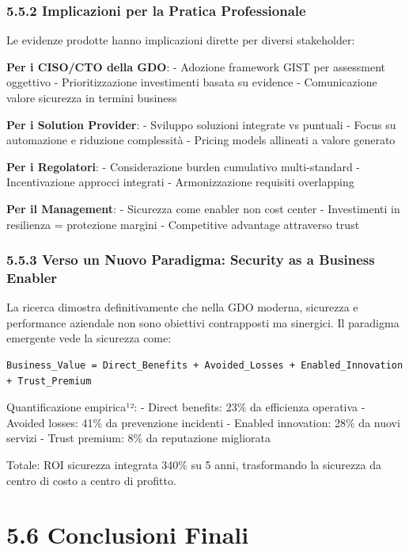 \documentclass{report}
\begin{document}
\subsubsection{5.5.2 Implicazioni per la Pratica
Professionale}\label{implicazioni-per-la-pratica-professionale}

Le evidenze prodotte hanno implicazioni dirette per diversi stakeholder:

\textbf{Per i CISO/CTO della GDO}: - Adozione framework GIST per
assessment oggettivo - Prioritizzazione investimenti basata su evidence
- Comunicazione valore sicurezza in termini business

\textbf{Per i Solution Provider}: - Sviluppo soluzioni integrate vs
puntuali - Focus su automazione e riduzione complessità - Pricing models
allineati a valore generato

\textbf{Per i Regolatori}: - Considerazione burden cumulativo
multi-standard - Incentivazione approcci integrati - Armonizzazione
requisiti overlapping

\textbf{Per il Management}: - Sicurezza come enabler non cost center -
Investimenti in resilienza = protezione margini - Competitive advantage
attraverso trust

\subsubsection{5.5.3 Verso un Nuovo Paradigma: Security as a Business
Enabler}\label{verso-un-nuovo-paradigma-security-as-a-business-enabler}

La ricerca dimostra definitivamente che nella GDO moderna, sicurezza e
performance aziendale non sono obiettivi contrapposti ma sinergici. Il
paradigma emergente vede la sicurezza come:

\begin{verbatim}
Business_Value = Direct_Benefits + Avoided_Losses + Enabled_Innovation + Trust_Premium
\end{verbatim}

Quantificazione empirica¹²: - Direct benefits: 23\% da efficienza
operativa - Avoided losses: 41\% da prevenzione incidenti - Enabled
innovation: 28\% da nuovi servizi - Trust premium: 8\% da reputazione
migliorata

Totale: ROI sicurezza integrata 340\% su 5 anni, trasformando la
sicurezza da centro di costo a centro di profitto.

\section{5.6 Conclusioni Finali}\label{conclusioni-finali}
\end{document}
